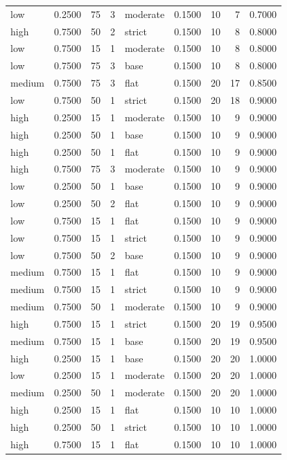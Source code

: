 \begin{tabular}{lrrrlrrrr}
low & 0.2500 & 75 & 3 & moderate & 0.1500 & 10 & 7 & 0.7000 \\
high & 0.7500 & 50 & 2 & strict & 0.1500 & 10 & 8 & 0.8000 \\
low & 0.7500 & 15 & 1 & moderate & 0.1500 & 10 & 8 & 0.8000 \\
low & 0.7500 & 75 & 3 & base & 0.1500 & 10 & 8 & 0.8000 \\
medium & 0.7500 & 75 & 3 & flat & 0.1500 & 20 & 17 & 0.8500 \\
low & 0.7500 & 50 & 1 & strict & 0.1500 & 20 & 18 & 0.9000 \\
high & 0.2500 & 15 & 1 & moderate & 0.1500 & 10 & 9 & 0.9000 \\
high & 0.2500 & 50 & 1 & base & 0.1500 & 10 & 9 & 0.9000 \\
high & 0.2500 & 50 & 1 & flat & 0.1500 & 10 & 9 & 0.9000 \\
high & 0.7500 & 75 & 3 & moderate & 0.1500 & 10 & 9 & 0.9000 \\
low & 0.2500 & 50 & 1 & base & 0.1500 & 10 & 9 & 0.9000 \\
low & 0.2500 & 50 & 2 & flat & 0.1500 & 10 & 9 & 0.9000 \\
low & 0.7500 & 15 & 1 & flat & 0.1500 & 10 & 9 & 0.9000 \\
low & 0.7500 & 15 & 1 & strict & 0.1500 & 10 & 9 & 0.9000 \\
low & 0.7500 & 50 & 2 & base & 0.1500 & 10 & 9 & 0.9000 \\
medium & 0.7500 & 15 & 1 & flat & 0.1500 & 10 & 9 & 0.9000 \\
medium & 0.7500 & 15 & 1 & strict & 0.1500 & 10 & 9 & 0.9000 \\
medium & 0.7500 & 50 & 1 & moderate & 0.1500 & 10 & 9 & 0.9000 \\
high & 0.7500 & 15 & 1 & strict & 0.1500 & 20 & 19 & 0.9500 \\
medium & 0.7500 & 15 & 1 & base & 0.1500 & 20 & 19 & 0.9500 \\
high & 0.2500 & 15 & 1 & base & 0.1500 & 20 & 20 & 1.0000 \\
low & 0.2500 & 15 & 1 & moderate & 0.1500 & 20 & 20 & 1.0000 \\
medium & 0.2500 & 50 & 1 & moderate & 0.1500 & 20 & 20 & 1.0000 \\
high & 0.2500 & 15 & 1 & flat & 0.1500 & 10 & 10 & 1.0000 \\
high & 0.2500 & 50 & 1 & strict & 0.1500 & 10 & 10 & 1.0000 \\
high & 0.7500 & 15 & 1 & flat & 0.1500 & 10 & 10 & 1.0000 \\

\end{tabular}
